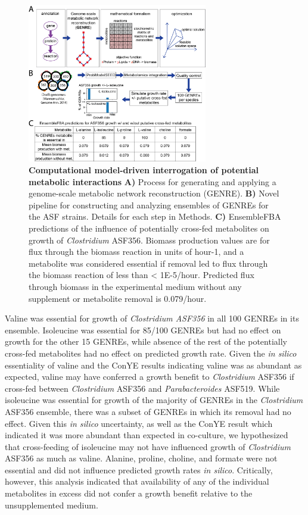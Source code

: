 \documentclass[11pt,twocolumn,notitlepage,openany,twoside]{book}
\begin{document}
\begin{refsection}
\begin{figure}[tb]
\centering
\includegraphics[width=0.7\textwidth]{ch2_figS3}
\caption[Computational model-driven interrogation of potential metabolic interactions and experimental validation of a cross-feeding interaction.]{\textbf{Computational model-driven interrogation of potential metabolic interactions}  \textbf{A)} Process for generating and applying a genome-scale metabolic network reconstruction (GENRE). \textbf{B)} Novel pipeline for constructing and analyzing ensembles of GENREs for the ASF strains. Details for each step in Methods. \textbf{C)} EnsembleFBA predictions of the influence of potentially cross-fed metabolites on growth of \textit{Clostridium} ASF356. Biomass production values are for flux through the biomass reaction in units of hour-1, and a metabolite was considered essential if removal led to flux through the biomass reaction of less than \textless\! 1E-5/hour. Predicted flux through biomass in the experimental medium without any supplement or metabolite removal is 0.079/hour.}
\end{figure}

Valine was essential for growth of \textit{Clostridium ASF356} in all 100 GENREs in its ensemble. Isoleucine was essential for 85/100 GENREs but had no effect on growth for the other 15 GENREs, while absence of the rest of the potentially cross-fed metabolites had no effect on predicted growth rate. Given the \textit{in silico} essentiality of valine and the ConYE results indicating valine was as abundant as expected, valine may have conferred a growth benefit to \textit{Clostridium} ASF356 if cross-fed between \textit{Clostridium} ASF356 and \textit{Parabacteroides} ASF519. While isoleucine was essential for growth of the majority of GENREs in the \textit{Clostridium} ASF356 ensemble, there was a subset of GENREs in which its removal had no effect. Given this \textit{in silico} uncertainty, as well as the ConYE result which indicated it was more abundant than expected in co-culture, we hypothesized that cross-feeding of isoleucine may not have influenced growth of \textit{Clostridium} ASF356 as much as valine. Alanine, proline, choline, and formate were not essential and did not influence predicted growth rates \textit{in silico}. Critically, however, this analysis indicated that availability of any of the individual metabolites in excess did not confer a growth benefit relative to the unsupplemented medium.


\end{refsection}
\end{document}
